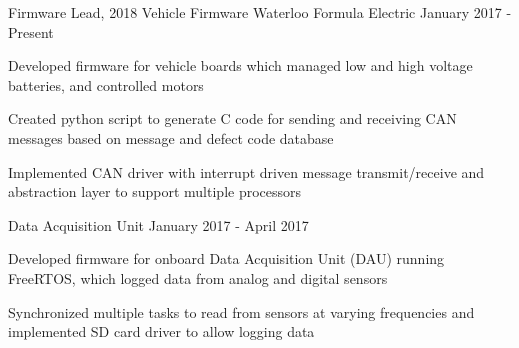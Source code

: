 

\begin{cventries}
  \cventrytwo
    {Firmware Lead, 2018 Vehicle Firmware} %
    {Waterloo Formula Electric} %
    {} %
    {January 2017 - Present} %
    {
      \begin{cvitems}
        \item {Developed firmware for vehicle boards which managed low and high voltage batteries, and controlled motors}
        \item {Created python script to generate C code for sending and receiving CAN messages based on message and defect code database}
        \item {Implemented CAN driver with interrupt driven message transmit/receive and abstraction layer to support multiple processors}
      \end{cvitems}
    }

  \cventrythree
    {}
    {Data Acquisition Unit} %
    {} %
    {January 2017 - April 2017} %
    {
      \begin{cvitems} %
        \item {Developed firmware for onboard Data Acquisition Unit (DAU) running FreeRTOS, which logged data from analog and digital sensors}
        \item {Synchronized multiple tasks to read from sensors at varying frequencies and implemented SD card driver to allow logging data}
      \end{cvitems}
    }


\end{cventries}
